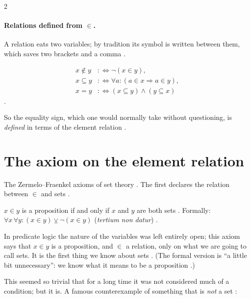 \begin{paracol}{2}
\paragraph{Relations defined from $\in$.} A relation eats two variables; by tradition its symbol is written between
them, which saves two brackets and a comma .

\begin{definition}\label{def:se-subset}
\begin{align*}
  x\notin y &:\Leftrightarrow \neg(x\in y), \\
  x\subseteq y &:\Leftrightarrow \forall a\colon (a\in x\Rightarrow a\in y), \\
  x=y &:\Leftrightarrow (x\subseteq y)\wedge(y\subseteq x)
\end{align*}
.
\end{definition}
So the equality sign, which one would normally take without questioning, is \emph{defined} in terms of the element
relation .

\section{The axiom on the element relation}\label{sec:se-ax-in}

The Zermelo--Fraenkel axioms of set theory . The first declares the relation between $\in$ and sets
.

\begin{definition}\label{ax:se-in}
$x\in y$ is a proposition if and only if $x$ and $y$ are both sets . Formally:
$\forall x\,\forall y\colon (x\in y)\veebar\neg(x\in y)$ (\emph{tertium non datur}) .
\end{definition}
In predicate logic the nature of the variables was left entirely open; this axiom says that $x\in y$ is a
proposition, and $\in$ a relation, only on what we are going to call sets. It is the first thing we know about sets
. (The formal version is ``a little bit unnecessary'': we know what it means to be a proposition
.)

This seemed so trivial that for a long time it was not considered much of a condition; but it is. A famous
counterexample of something that is \emph{not} a set :


\end{paracol}
